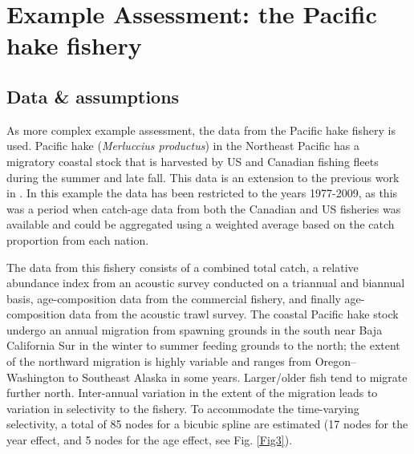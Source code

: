 \section{Example Assessment: the Pacific hake fishery}
\begin{multicols}{2}
\subsection{Data \& assumptions}
As more complex example assessment, the data from the Pacific hake fishery is used.  Pacific hake (\textit{Merluccius productus})  in the Northeast Pacific has a migratory coastal stock that is harvested by US and Canadian fishing fleets during the summer and late fall.  This data is an extension to the previous work in \cite{Martell2008pam}.  In this example the data has been restricted to the years 1977-2009, as this was a period when catch-age data from both the Canadian and US fisheries was available and could be aggregated using a weighted average based on the catch proportion from each nation.

The data from this fishery consists of a combined total catch, a relative abundance index from an acoustic survey conducted on a triannual and biannual basis, age-composition data from the commercial fishery, and finally age-composition data from the acoustic trawl survey. The coastal Pacific hake stock undergo an annual migration from spawning grounds in the south near Baja California Sur in the winter to summer feeding grounds to the north; the extent of the northward migration is highly variable and ranges from Oregon--Washington to Southeast Alaska in some years.  Larger/older fish tend to migrate further north.  Inter-annual variation in the extent of the migration leads to variation in selectivity to the fishery.  To accommodate the time-varying selectivity, a total of 85 nodes for a bicubic spline are estimated (17 nodes for the year effect, and 5 nodes for the age effect, see Fig. \ref{Fig3}).


\end{multicols}
